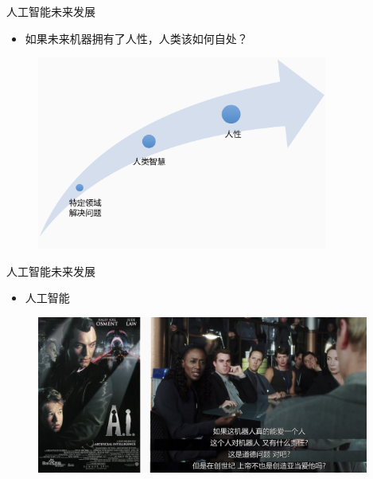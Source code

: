 \documentclass{beamer}
\begin{document}
  \begin{frame}{人工智能未来发展}
    \begin{itemize}
     \item  如果未来机器拥有了人性，人类该如何自处？
    \end{itemize}
   \begin{figure}[H]
   \centering
   \includegraphics[height=2.5in]{cdjPic1.jpg}
   \end{figure}
  \end{frame}
  

   \begin{frame}{人工智能未来发展}
    \begin{itemize}
     \item 人工智能
    \end{itemize}
   \begin{figure}[H]
   \centering
   \includegraphics[width=4.3in]{cdjPic4.jpg}
   \end{figure}
  \end{frame}
\end{document}
